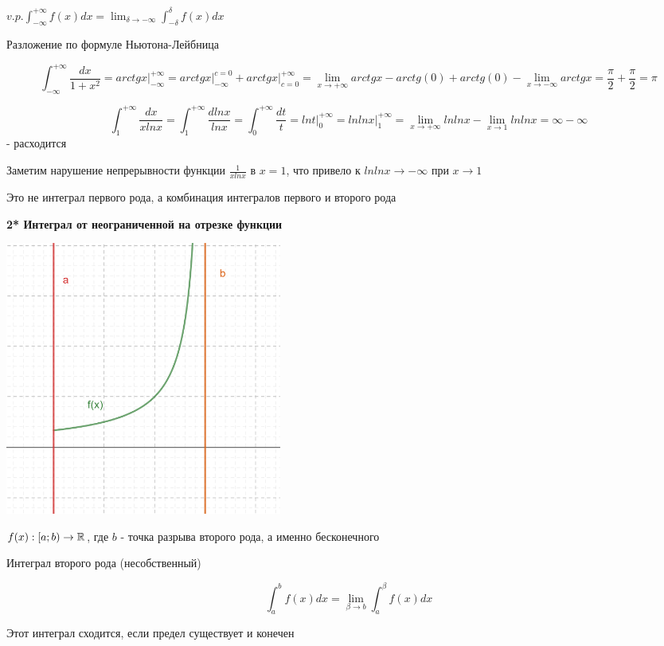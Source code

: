 \documentclass[12pt]{article}
\begin{document}
    $\displaystyle v.p. \int^{+\infty}_{-\infty} f(x) dx = \lim_{\delta \to -\infty} \int^{\delta}_{-\delta} f(x) dx$

    Разложение по формуле Ньютона-Лейбница

     \[\int^{+\infty}_{-\infty} \frac{dx}{1 + x^2} = arctg x \Big|^{+\infty}_{-\infty} = arctg x \Big|^{c = 0}_{-\infty} + arctg x \Big|^{+\infty}_{c = 0} =
    \lim_{x \to +\infty} arctgx - arctg(0) + arctg(0) - \lim_{x \to -\infty} arctgx = \frac{\pi}{2} + \frac{\pi}{2} = \pi\]

     \[\int^{+\infty}_{1} \frac{dx}{xlnx} = \int^{+\infty}_{1} \frac{dlnx}{lnx} = \int^{+\infty}_{0} \frac{dt}{t}
     = lnt \Big|^{+\infty}_{0} = ln ln x \Big|^{+\infty}_{1} = \lim_{x \to +\infty} ln ln x - \lim_{x \to 1} ln ln x = \infty - \infty\] - расходится

    Заметим нарушение непрерывности функции $\frac{1}{xlnx}$ в $x = 1$, что привело к $ln lnx \to -\infty$ при $x \to 1$

    Это не интеграл первого рода, а комбинация интегралов первого и второго рода

    \textbf{2* Интеграл от неограниченной на отрезке функции}

    \includegraphics[height=90mm]{images/calculus_2024_02_21_4}

    $f(x) : [a; b) \to \mathbb{R}$, где $b$ - точка разрыва второго рода, а именно бесконечного

     Интеграл второго рода (несобственный)

    \[\int^{b}_{a} f(x) dx = \lim_{\beta \to b} \int^{\beta}_{a} f(x) dx\]

    Этот интеграл сходится, если предел существует и конечен
\end{document}
